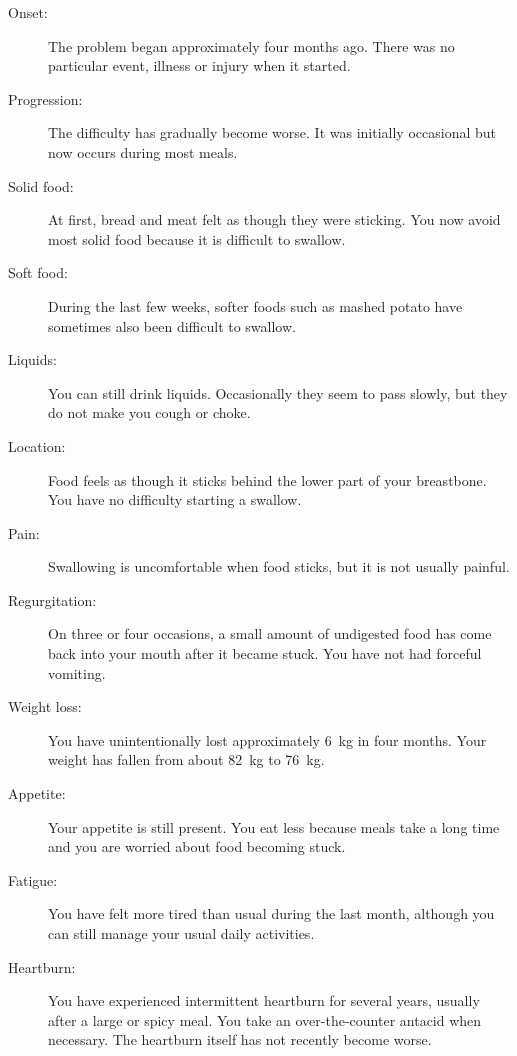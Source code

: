 \begin{description}
    \item[Onset:]
    The problem began approximately four months ago. There was no
    particular event, illness or injury when it started.

    \item[Progression:]
    The difficulty has gradually become worse. It was initially
    occasional but now occurs during most meals.

    \item[Solid food:]
    At first, bread and meat felt as though they were sticking. You now
    avoid most solid food because it is difficult to swallow.

    \item[Soft food:]
    During the last few weeks, softer foods such as mashed potato have
    sometimes also been difficult to swallow.

    \item[Liquids:]
    You can still drink liquids. Occasionally they seem to pass slowly,
    but they do not make you cough or choke.

    \item[Location:]
    Food feels as though it sticks behind the lower part of your
    breastbone. You have no difficulty starting a swallow.

    \item[Pain:]
    Swallowing is uncomfortable when food sticks, but it is not usually
    painful.

    \item[Regurgitation:]
    On three or four occasions, a small amount of undigested food has
    come back into your mouth after it became stuck. You have not had
    forceful vomiting.

    \item[Weight loss:]
    You have unintentionally lost approximately \SI{6}{\kilogram} in
    four months. Your weight has fallen from about \SI{82}{\kilogram}
    to \SI{76}{\kilogram}.

    \item[Appetite:]
    Your appetite is still present. You eat less because meals take a
    long time and you are worried about food becoming stuck.

    \item[Fatigue:]
    You have felt more tired than usual during the last month, although
    you can still manage your usual daily activities.

    \item[Heartburn:]
    You have experienced intermittent heartburn for several years,
    usually after a large or spicy meal. You take an over-the-counter
    antacid when necessary. The heartburn itself has not recently
    become worse.
\end{description}

